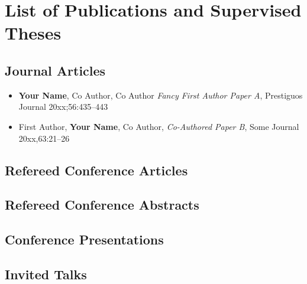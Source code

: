 \chapter*{List of Publications and Supervised Theses}
\label{sec:Publications}

\section*{Journal Articles}
\begin{itemize}[leftmargin=*,label={\textbullet}]
\item \textbf{Your Name}, Co Author, Co Author \textit{Fancy First Author Paper A}, Prestiguos Journal 20xx;56:435--443
\item First Author, \textbf{Your Name}, Co Author, \textit{Co-Authored Paper B}, Some Journal 20xx,63:21--26
\end{itemize}
\section*{Refereed Conference Articles}

\section*{Refereed Conference Abstracts}

\section*{Conference Presentations}

\section*{Invited Talks}

